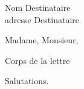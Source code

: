 \documentclass[12pt]{lettre}
\begin{document}
\begin{letter}{Nom Destinataire\\
               adresse Destinataire}

\def\concname{Objet :~} %
\opening{Madame, Monsieur,}

Corps de la lettre

\closing{Salutations.}

\end{letter}
\end{document}
